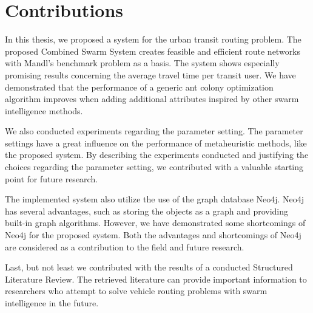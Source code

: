 \section{Contributions}
\label{sec:contributions}

%

In this thesis, we proposed a system for the urban transit routing problem. The proposed Combined Swarm System creates feasible and efficient route networks with Mandl's benchmark problem\citep{mandl79} as a basis. The system shows especially promising results concerning the average travel time per transit user. We have demonstrated that the performance of a generic ant colony optimization algorithm improves when adding additional attributes inspired by other swarm intelligence methods. 

We also conducted experiments regarding the parameter setting. The parameter settings have a great influence on the performance of metaheuristic methods, like the proposed system. By describing the experiments conducted and justifying the choices regarding the parameter setting, we contributed with a valuable starting point for future research. 

The implemented system also utilize the use of the graph database Neo4j. Neo4j has several advantages, such as storing the objects as a graph and providing built-in graph algorithms. However, we have demonstrated some shortcomings of Neo4j for the proposed system. Both the advantages and shortcomings of Neo4j are considered as a contribution to the field and future research. 

Last, but not least we contributed with the results of a conducted Structured Literature Review. The retrieved literature can provide important information to researchers who attempt to solve vehicle routing problems with swarm intelligence in the future. 


